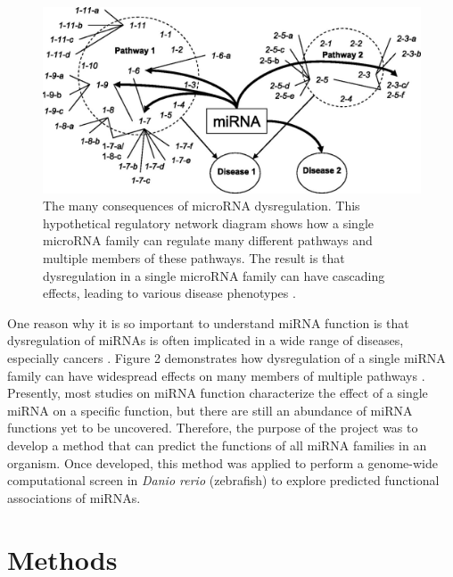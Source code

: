 \documentclass[12pt]{article}
\begin{document}
\begin{figure}[]
\includegraphics[width=.5\textwidth]{figures/zh70100933700002.jpeg}
\centering
\caption[Consequences of microRNA Dysregulation]{The many consequences of microRNA dysregulation. This hypothetical regulatory network diagram shows how a single microRNA family can regulate many different pathways and multiple members of these pathways. The result is that dysregulation in a single microRNA family can have  cascading effects, leading to various disease phenotypes \cite{liang2009microrna}.}
\centering
\label{2}
\end{figure}

One reason why it is so important to understand miRNA function is that dysregulation of miRNAs is often implicated in a wide range of diseases, especially cancers \cite{lu2008analysis, gebeshuber2013mir}. Figure 2 demonstrates how dysregulation of a single miRNA family can have widespread effects on many members of multiple pathways \cite{liang2009microrna}. Presently, most studies on miRNA function characterize the effect of a single miRNA on a specific function, but there are still an abundance of miRNA functions yet to be uncovered. Therefore, the purpose of the project was to develop a method that can predict the functions of all miRNA families in an organism. Once developed, this method was applied to perform a genome-wide computational screen in \textit{Danio rerio} (zebrafish) to explore predicted functional associations of miRNAs.

\section{   Methods}
\end{document}
